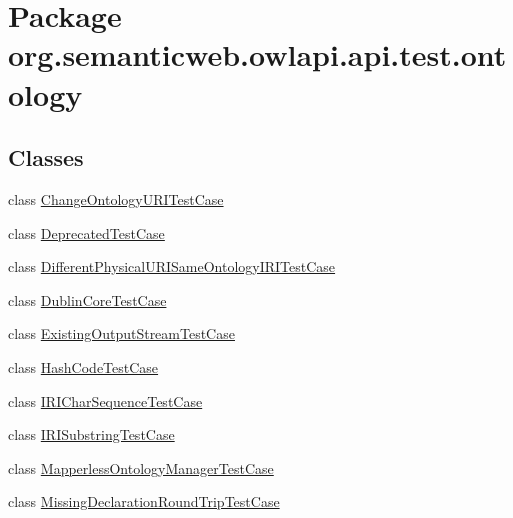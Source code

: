 \hypertarget{namespaceorg_1_1semanticweb_1_1owlapi_1_1api_1_1test_1_1ontology}{\section{Package org.\-semanticweb.\-owlapi.\-api.\-test.\-ontology}
\label{namespaceorg_1_1semanticweb_1_1owlapi_1_1api_1_1test_1_1ontology}
}
\subsection*{Classes}
\begin{DoxyCompactItemize}
\item 
class \hyperlink{classorg_1_1semanticweb_1_1owlapi_1_1api_1_1test_1_1ontology_1_1_change_ontology_u_r_i_test_case}{Change\-Ontology\-U\-R\-I\-Test\-Case}
\item 
class \hyperlink{classorg_1_1semanticweb_1_1owlapi_1_1api_1_1test_1_1ontology_1_1_deprecated_test_case}{Deprecated\-Test\-Case}
\item 
class \hyperlink{classorg_1_1semanticweb_1_1owlapi_1_1api_1_1test_1_1ontology_1_1_different_physical_u_r_i_same_ontology_i_r_i_test_case}{Different\-Physical\-U\-R\-I\-Same\-Ontology\-I\-R\-I\-Test\-Case}
\item 
class \hyperlink{classorg_1_1semanticweb_1_1owlapi_1_1api_1_1test_1_1ontology_1_1_dublin_core_test_case}{Dublin\-Core\-Test\-Case}
\item 
class \hyperlink{classorg_1_1semanticweb_1_1owlapi_1_1api_1_1test_1_1ontology_1_1_existing_output_stream_test_case}{Existing\-Output\-Stream\-Test\-Case}
\item 
class \hyperlink{classorg_1_1semanticweb_1_1owlapi_1_1api_1_1test_1_1ontology_1_1_hash_code_test_case}{Hash\-Code\-Test\-Case}
\item 
class \hyperlink{classorg_1_1semanticweb_1_1owlapi_1_1api_1_1test_1_1ontology_1_1_i_r_i_char_sequence_test_case}{I\-R\-I\-Char\-Sequence\-Test\-Case}
\item 
class \hyperlink{classorg_1_1semanticweb_1_1owlapi_1_1api_1_1test_1_1ontology_1_1_i_r_i_substring_test_case}{I\-R\-I\-Substring\-Test\-Case}
\item 
class \hyperlink{classorg_1_1semanticweb_1_1owlapi_1_1api_1_1test_1_1ontology_1_1_mapperless_ontology_manager_test_case}{Mapperless\-Ontology\-Manager\-Test\-Case}
\item 
class \hyperlink{classorg_1_1semanticweb_1_1owlapi_1_1api_1_1test_1_1ontology_1_1_missing_declaration_round_trip_test_case}{Missing\-Declaration\-Round\-Trip\-Test\-Case}

\end{DoxyCompactItemize}
